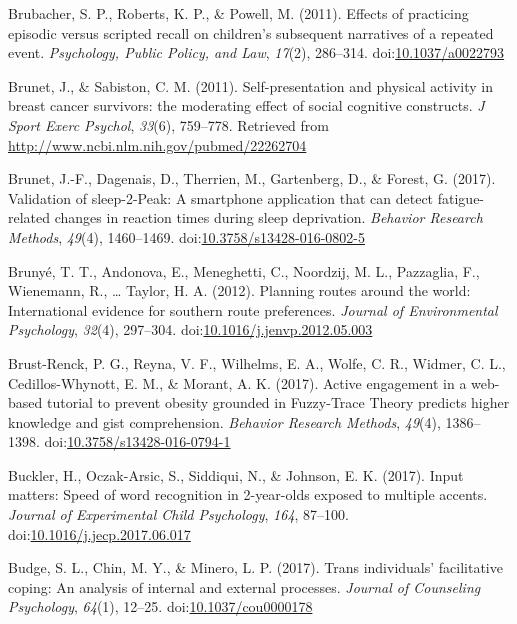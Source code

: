 \documentclass[english,man]{apa6}
\theoremstyle{definition}
\theoremstyle{definition}
\theoremstyle{definition}
\theoremstyle{remark}
\begin{document}
\hypertarget{ref-Brubacher2011}{}
Brubacher, S. P., Roberts, K. P., \& Powell, M. (2011). Effects of
practicing episodic versus scripted recall on children's subsequent
narratives of a repeated event. \emph{Psychology, Public Policy, and
Law}, \emph{17}(2), 286--314.
doi:\href{https://doi.org/10.1037/a0022793}{10.1037/a0022793}

\hypertarget{ref-Brunet2011}{}
Brunet, J., \& Sabiston, C. M. (2011). Self-presentation and physical
activity in breast cancer survivors: the moderating effect of social
cognitive constructs. \emph{J Sport Exerc Psychol}, \emph{33}(6),
759--778. Retrieved from
\url{http://www.ncbi.nlm.nih.gov/pubmed/22262704}

\hypertarget{ref-Brunet2016}{}
Brunet, J.-F., Dagenais, D., Therrien, M., Gartenberg, D., \& Forest, G.
(2017). Validation of sleep-2-Peak: A smartphone application that can
detect fatigue-related changes in reaction times during sleep
deprivation. \emph{Behavior Research Methods}, \emph{49}(4), 1460--1469.
doi:\href{https://doi.org/10.3758/s13428-016-0802-5}{10.3758/s13428-016-0802-5}

\hypertarget{ref-Brunye2012}{}
Brunyé, T. T., Andonova, E., Meneghetti, C., Noordzij, M. L., Pazzaglia,
F., Wienemann, R., \ldots{} Taylor, H. A. (2012). Planning routes around
the world: International evidence for southern route preferences.
\emph{Journal of Environmental Psychology}, \emph{32}(4), 297--304.
doi:\href{https://doi.org/10.1016/j.jenvp.2012.05.003}{10.1016/j.jenvp.2012.05.003}

\hypertarget{ref-Brust-Renck2016}{}
Brust-Renck, P. G., Reyna, V. F., Wilhelms, E. A., Wolfe, C. R., Widmer,
C. L., Cedillos-Whynott, E. M., \& Morant, A. K. (2017). Active
engagement in a web-based tutorial to prevent obesity grounded in
Fuzzy-Trace Theory predicts higher knowledge and gist comprehension.
\emph{Behavior Research Methods}, \emph{49}(4), 1386--1398.
doi:\href{https://doi.org/10.3758/s13428-016-0794-1}{10.3758/s13428-016-0794-1}

\hypertarget{ref-Buckler2017}{}
Buckler, H., Oczak-Arsic, S., Siddiqui, N., \& Johnson, E. K. (2017).
Input matters: Speed of word recognition in 2-year-olds exposed to
multiple accents. \emph{Journal of Experimental Child Psychology},
\emph{164}, 87--100.
doi:\href{https://doi.org/10.1016/j.jecp.2017.06.017}{10.1016/j.jecp.2017.06.017}

\hypertarget{ref-Budge2017}{}
Budge, S. L., Chin, M. Y., \& Minero, L. P. (2017). Trans individuals'
facilitative coping: An analysis of internal and external processes.
\emph{Journal of Counseling Psychology}, \emph{64}(1), 12--25.
doi:\href{https://doi.org/10.1037/cou0000178}{10.1037/cou0000178}
\end{document}
